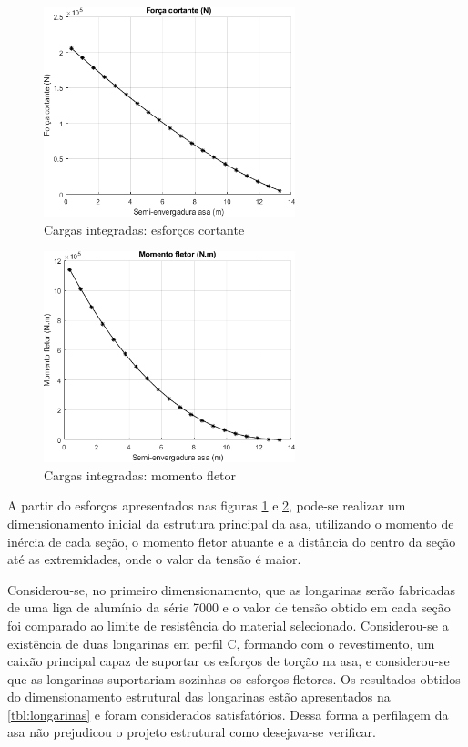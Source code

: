 \begin{figure}[H]
\centering
\includegraphics[width=0.65\textwidth]{images/parte3/loads_shear.png}
\caption{Cargas integradas: esforços cortante}
\label{fig:loads_shear}
\end{figure}


\begin{figure}[H]
\centering
\includegraphics[width=0.65\textwidth]{images/parte3/loads_bending.png}
\caption{Cargas integradas: momento fletor}
\label{fig:loads_bending}
\end{figure}


A partir do esforços apresentados nas figuras \ref{fig:loads_shear} e \ref{fig:loads_bending}, pode-se realizar um dimensionamento inicial da estrutura principal da asa, utilizando o momento de inércia de cada seção, o momento fletor atuante e a distância do centro da seção até as extremidades, onde o valor da tensão é maior.

Considerou-se, no primeiro dimensionamento, que as longarinas serão fabricadas de uma liga de alumínio da série 7000 e o valor de tensão obtido em cada seção foi comparado ao limite de resistência do material selecionado. Considerou-se a existência de duas longarinas em perfil C, formando com o revestimento, um caixão principal capaz de suportar os esforços de torção na asa, e considerou-se que as longarinas suportariam sozinhas os esforços fletores. Os resultados obtidos do dimensionamento estrutural das longarinas estão apresentados na \autoref{tbl:longarinas} e foram considerados satisfatórios. Dessa forma a perfilagem da asa não prejudicou o projeto estrutural como desejava-se verificar.


